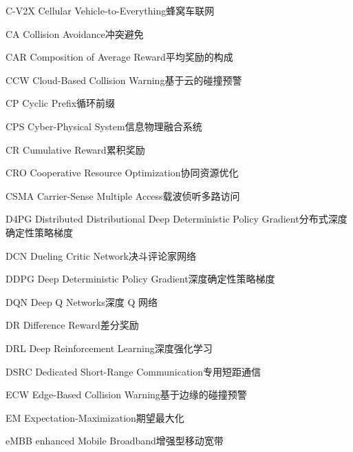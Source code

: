 \begin{abbreviate}[0mm][18mm]
\item[C-V2X] Cellular Vehicle-to-Everything\hspace{1em}蜂窝车联网
\item[CA] Collision Avoidance\hspace{1em}冲突避免
\item[CAR] Composition of Average Reward\hspace{1em}平均奖励的构成
\item[CCW] Cloud-Based Collision Warning\hspace{1em}基于云的碰撞预警
\item[CP] Cyclic Prefix\hspace{1em}循环前缀
\item[CPS] Cyber-Physical System\hspace{1em}信息物理融合系统
\item[CR] Cumulative Reward\hspace{1em}累积奖励
\item[CRO] Cooperative Resource Optimization\hspace{1em}协同资源优化
\item[CSMA] Carrier-Sense Multiple Access\hspace{1em}载波侦听多路访问
\item[D4PG] Distributed Distributional Deep Deterministic Policy Gradient\hspace{1em}分布式深度确定性策略梯度
\item[DCN] Dueling Critic Network\hspace{1em}决斗评论家网络
\item[DDPG] Deep Deterministic Policy Gradient\hspace{1em}深度确定性策略梯度
\item[DQN] Deep Q Networks\hspace{1em}深度 Q 网络
\item[DR] Difference Reward\hspace{1em}差分奖励
\item[DRL] Deep Reinforcement Learning\hspace{1em}深度强化学习
\item[DSRC] Dedicated Short-Range Communication\hspace{1em}专用短距通信
\item[ECW] Edge-Based Collision Warning\hspace{1em}基于边缘的碰撞预警
\item[EM] Expectation-Maximization\hspace{1em}期望最大化
\item[eMBB] enhanced Mobile Broadband\hspace{1em}增强型移动宽带

\end{abbreviate}
